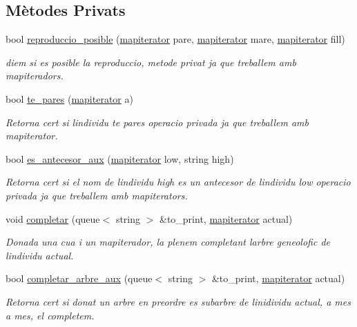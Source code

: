\subsection*{Mètodes Privats}
\begin{DoxyCompactItemize}
\item 
bool \hyperlink{classpoblacio_ad8651d82e2eb8863e853d57d9b8b9985}{reproduccio\+\_\+posible} (\hyperlink{classpoblacio_a52c3d96b08f7679f27487e7499185ed1}{mapiterator} pare, \hyperlink{classpoblacio_a52c3d96b08f7679f27487e7499185ed1}{mapiterator} mare, \hyperlink{classpoblacio_a52c3d96b08f7679f27487e7499185ed1}{mapiterator} fill)
\begin{DoxyCompactList}\small\item\em diem si es posible la reproduccio, metode privat ja que treballem amb mapiteradors. \end{DoxyCompactList}\item 
bool \hyperlink{classpoblacio_a03e79690411d8ca8aa7d1e5646ca1c19}{te\+\_\+pares} (\hyperlink{classpoblacio_a52c3d96b08f7679f27487e7499185ed1}{mapiterator} a)
\begin{DoxyCompactList}\small\item\em Retorna cert si l\textquotesingle{}individu te pares operacio privada ja que treballem amb mapiterator. \end{DoxyCompactList}\item 
bool \hyperlink{classpoblacio_a068248eaa6d1090e4114e2c799c850b1}{es\+\_\+antecesor\+\_\+aux} (\hyperlink{classpoblacio_a52c3d96b08f7679f27487e7499185ed1}{mapiterator} low, string high)
\begin{DoxyCompactList}\small\item\em Retorna cert si el nom de l\textquotesingle{}individu high es un antecesor de l\textquotesingle{}individu low operacio privada ja que treballem amb mapiterator\textquotesingle{}s. \end{DoxyCompactList}\item 
void \hyperlink{classpoblacio_a90b5d501f5b346aecb3c1ba170b3fb6f}{completar} (queue$<$ string $>$ \&to\+\_\+print, \hyperlink{classpoblacio_a52c3d96b08f7679f27487e7499185ed1}{mapiterator} actual)
\begin{DoxyCompactList}\small\item\em Donada una cua i un mapiterador, la plenem completant l\textquotesingle{}arbre geneolofic de l\textquotesingle{}individu actual. \end{DoxyCompactList}\item 
bool \hyperlink{classpoblacio_a85493b733f10c8a276986a5a32404352}{completar\+\_\+arbre\+\_\+aux} (queue$<$ string $>$ \&to\+\_\+print, \hyperlink{classpoblacio_a52c3d96b08f7679f27487e7499185ed1}{mapiterator} actual)
\begin{DoxyCompactList}\small\item\em Retorna cert si donat un arbre en preordre es subarbre de l\textquotesingle{}inidividu actual, a mes a mes, el completem. \end{DoxyCompactList}\end{DoxyCompactItemize}
